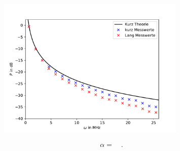 
\begin{figure}[h]
	\centering
	\includegraphics[width=0.8\textwidth]{Daempfung/build/PlotB.pdf}
	\caption{}
	\label{fig:PlotDaempfungB}
\end{figure}
\begin{align}
	\alpha =  \quad.
\end{align}\clearpage